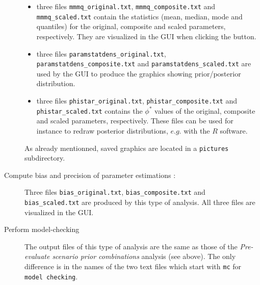 \begin{description}
  \begin{itemize}
   \item three files \texttt{mmmq\_original.txt}, \texttt{mmmq\_composite.txt} and \texttt{mmmq\_scaled.txt} contain the statistics (mean, median, mode and quantiles) for the original, composite and scaled parameters, respectively. They are visualized in the GUI when clicking the  button. 
   \item three files \texttt{paramstatdens\_original.txt}, \texttt{paramstatdens\_composite.txt} and \texttt{paramstatdens\_scaled.txt} are used by the GUI to produce the graphics showing prior/posterior distribution.
   \item three files \texttt{phistar\_original.txt}, \texttt{phistar\_composite.txt} and \texttt{phistar\_scaled.txt} contains the $\phi^*$ values of the original, composite and scaled parameters, respectively. These files can be used for instance to redraw posterior distributions, $e.g.$ with the $R$ software.
  \end{itemize}
As already mentionned, saved graphics are located in a \texttt{pictures} subdirectory.
 \item [Compute bias and precision of parameter estimations :] Three files \texttt{bias\_original.txt}, \texttt{bias\_composite.txt} and \texttt{bias\_scaled.txt} are produced by this type of analysis. All three files are visualized in the GUI. 
 \item [Perform model-checking] The output files of this type of analysis are the same as those of the \textit{Pre-evaluate scenario prior combinations} analysis (see above). The only difference is in the names of the two text files which start with \texttt{mc} for \texttt{model checking}. 
\end{description}
~\\

